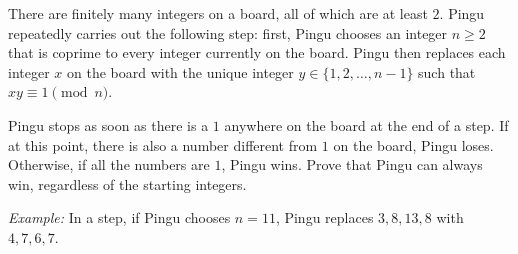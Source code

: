 There are finitely many integers on a board, all of which are at least $2$.
Pingu repeatedly carries out the following step:
first, Pingu chooses an integer $n\geq 2$ that is coprime to every integer currently on the board.
Pingu then replaces each integer $x$ on the board with the unique
integer $y \in \{1,2,\dots,n-1\}$ such that $xy \equiv 1 \pmod{n}$.

Pingu stops as soon as there is a $1$ anywhere on the board at the end of a step.
If at this point, there is also a number different from $1$ on the board, Pingu loses.
Otherwise, if all the numbers are $1$, Pingu wins.
Prove that Pingu can always win, regardless of the starting integers.
    
\emph{Example:} In a step, if Pingu chooses $n = 11$,
Pingu replaces $3, 8, 13, 8$ with $4, 7, 6, 7$.

